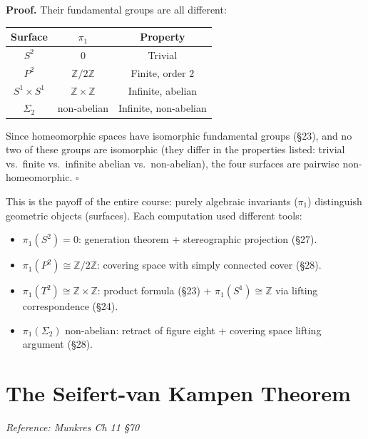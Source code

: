 \documentclass[11pt]{report}
\renewenvironment{proof}[1][Proof]{\noindent\textbf{#1.} }{\hfill$\square$\par\vspace{5pt}}
\begin{document}
\begin{proof}
Their fundamental groups are all different:
\begin{center}
\begin{tabular}{|c|c|c|}
\hline
\textbf{Surface} & $\pi_1$ & \textbf{Property} \\
\hline
$S^2$ & $0$ & Trivial \\
\hline
$P^2$ & $\mathbb{Z}/2\mathbb{Z}$ & Finite, order $2$ \\
\hline
$S^1 \times S^1$ & $\mathbb{Z} \times \mathbb{Z}$ & Infinite, abelian \\
\hline
$\Sigma_2$ & non-abelian & Infinite, non-abelian \\
\hline
\end{tabular}
\end{center}
Since homeomorphic spaces have isomorphic fundamental groups (\S 23), and no two of these groups are isomorphic (they differ in the properties listed: trivial vs.\ finite vs.\ infinite abelian vs.\ non-abelian), the four surfaces are pairwise non-homeomorphic.
\end{proof}

\begin{rembox}
This is the payoff of the entire course: purely algebraic invariants ($\pi_1$) distinguish geometric objects (surfaces). Each computation used different tools:
\begin{itemize}[nosep]
    \item $\pi_1(S^2) = 0$: generation theorem + stereographic projection (\S 27).
    \item $\pi_1(P^2) \cong \mathbb{Z}/2\mathbb{Z}$: covering space with simply connected cover (\S 28).
    \item $\pi_1(T^2) \cong \mathbb{Z} \times \mathbb{Z}$: product formula (\S 23) + $\pi_1(S^1) \cong \mathbb{Z}$ via lifting correspondence (\S 24).
    \item $\pi_1(\Sigma_2)$ non-abelian: retract of figure eight + covering space lifting argument (\S 28).
\end{itemize}
\end{rembox}

\newpage
\section{The Seifert-van Kampen Theorem}

\textit{Reference: Munkres Ch 11 \S 70}
\end{document}
